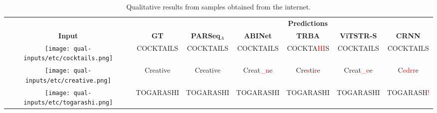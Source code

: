 \begin{table*}[htb]
  \centering
  \tiny
  \setlength\tabcolsep{3pt}
  \caption{Qualitative results from samples obtained from the internet.}
  \begin{tabular}{ c c c c c c c }
    \toprule
    & & \multicolumn{5}{c}{\textbf{Predictions}} \\
    \cmidrule{3-7}
    \textbf{Input} & \textbf{GT} & \textbf{PARSeq$_A$} & \textbf{ABINet} & \textbf{TRBA} & \textbf{ViTSTR-S} & \textbf{CRNN} \\
    \midrule
    \texttt{[image: qual-inputs/etc/cocktails.png]} & {\tiny COCKTAILS} & {\tiny COCKTAILS} & {\tiny COCKTAILS} & {\tiny COCKTA\textcolor{red}{HI}S} & {\tiny COCKTAILS} & {\tiny COCKTAILS} \\
    \texttt{[image: qual-inputs/etc/creative.png]} & {\normalsize Creative} & {\normalsize Creative} & {\normalsize Creat\textcolor{red}{\_n}e} & {\normalsize Cre\textcolor{red}{s}ti\textcolor{red}{r}e} & {\normalsize Creat\textcolor{red}{\_e}e} & {\normalsize C\textcolor{red}{edrr}e} \\
\texttt{[image: qual-inputs/etc/togarashi.png]} & TOGARASHI & TOGARASHI & TOGARASHI & TOGARASHI & TOGARASHI & TOGARASH\textcolor{red}{!} \\
    \bottomrule
  \end{tabular}
  \label{tab:qual-results-misc}
\end{table*}

